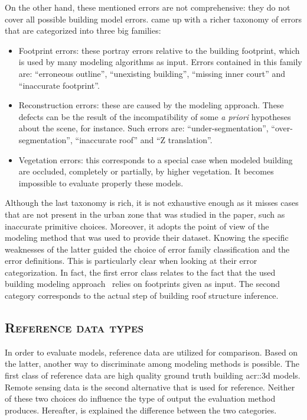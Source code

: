             On the other hand, these mentioned errors are not comprehensive: they do not cover all possible building model errors.
            \textcite{michelin2013quality} came up with a richer taxonomy of errors that are categorized into three big families:
            \begin{itemize}
                \item Footprint errors: these portray errors relative to the building footprint, which is used by many modeling algorithms as input.
                        Errors contained in this family are: ``erroneous outline'', ``unexisting building'', ``missing inner court'' and ``inaccurate footprint''.
                \item Reconstruction errors: these are caused by the modeling approach.
                        These defects can be the result of the incompatibility of some \textit{a priori} hypotheses about the scene, for instance.
                        Such errors are: ``under-segmentation'', ``over-segmentation'', ``inaccurate roof'' and ``Z translation''.
                \item Vegetation errors: this corresponds to a special case when modeled building are occluded, completely or partially, by higher vegetation.
                        It becomes impossible to evaluate properly these models.
            \end{itemize}
            Although the last taxonomy is rich, it is not exhaustive enough as it misses cases that are not present in the urban zone that was studied in the paper, such as inaccurate primitive choices.
            Moreover, it adopts the point of view of the modeling method that was used to provide their dataset.
            Knowing the specific weaknesses of the latter guided the choice of error family classification and the error definitions.
            This is particularly clear when looking at their error categorization.
            In fact, the first error class relates to the fact that the used building modeling approach~\parencite{durupt2006automatic} relies on footprints given as input.
            The second category corresponds to the actual step of building roof structure inference.

    \subsection{\textsc{Reference data types}}
        \label{subsec::state_of_the_art::quality::reference}
        In order to evaluate models, reference data are utilized for comparison.
        Based on the latter, another way to discriminate among modeling methods is possible.
        The first class of reference data are high quality ground truth building \gls{acr::3d} models.
        Remote sensing data is the second alternative that is used for reference.
        Neither of these two choices do influence the type of output the evaluation method produces.
        Hereafter, is explained the difference between the two categories.

